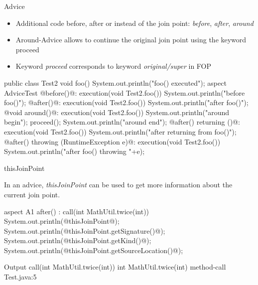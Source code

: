 \begin{frame}[b,fragile]{Advice}
	\vspace{-12mm}
	\begin{mycolumns}[widths={38}]
		\begin{note}{}
			\begin{itemize}
				\item Additional code before, after or instead of the join point: \emph{before}, \emph{after}, \emph{around}
				\item Around-Advice allows to continue the original join point using the keyword proceed
				\item Keyword \emph{proceed} corresponds to keyword \emph{original/super} in FOP
			\end{itemize}
		\end{note}
	\mynextcolumn
\begin{codetight}{}
public class Test2 {
	void foo() {
		System.out.println("foo() executed");
	}
}
aspect AdviceTest {
	@before()@: execution(void Test2.foo()) {
		System.out.println("before foo()");
	}
	@after()@: execution(void Test2.foo()) {
		System.out.println("after foo()");
	}
	@void around()@: execution(void Test2.foo()) {
		System.out.println("around begin");
		proceed();
		System.out.println("around end");
	}
	@after() returning ()@: execution(void Test2.foo()) {
		System.out.println("after returning from foo()");
	}
	@after() throwing (RuntimeException e)@: execution(void Test2.foo()) {
		System.out.println("after foo() throwing "+e);
	}
}
\end{codetight}
	\end{mycolumns}
\end{frame}

\begin{frame}[fragile]{thisJoinPoint}
	\begin{mycolumns}[widths={30},animation=none]
		\begin{note}{}
			In an advice, \emph{thisJoinPoint} can be used to get more information about the current join point.
		\end{note}
	\mynextcolumn
\begin{codetight}{}
aspect A1 {
	after() : call(int MathUtil.twice(int)) {
		System.out.println(@thisJoinPoint@);
		System.out.println(@thisJoinPoint.getSignature()@);
		System.out.println(@thisJoinPoint.getKind()@);
		System.out.println(@thisJoinPoint.getSourceLocation()@);
	}
}
\end{codetight}
\begin{codetight}{Output}
call(int MathUtil.twice(int))
int MathUtil.twice(int)
method-call
Test.java:5
\end{codetight}
	\end{mycolumns}
\end{frame}

